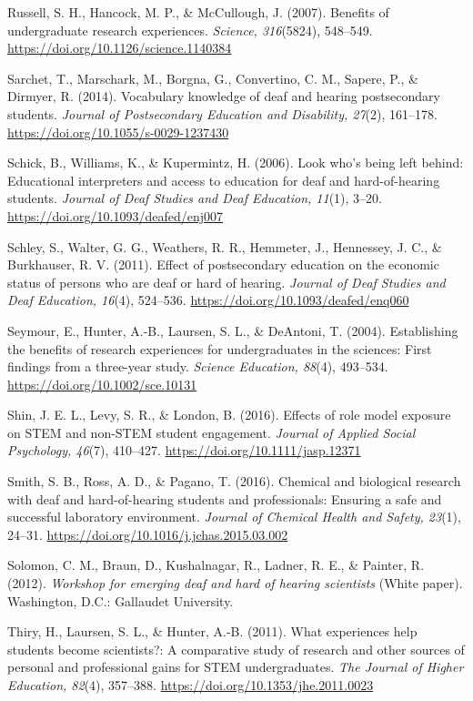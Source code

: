 \documentclass[11.5pt]{sig-alternate} %
\begin{document}
Russell, S. H., Hancock, M. P., \& McCullough, J. (2007). Benefits of undergraduate research experiences. \textit{Science, 316}(5824), 548–549. \url{https://doi.org/10.1126/science.1140384}

Sarchet, T., Marschark, M., Borgna, G., Convertino, C. M., Sapere, P., \& Dirmyer, R. (2014). Vocabulary knowledge of deaf and hearing postsecondary students. \textit{Journal of Postsecondary Education and Disability, 27}(2), 161–178. \url{https://doi.org/10.1055/s-0029-1237430}

Schick, B., Williams, K., \& Kupermintz, H. (2006). Look who’s being left behind: Educational interpreters and access to education for deaf and hard-of-hearing students. \textit{Journal of Deaf Studies and Deaf Education, 11}(1), 3–20. \url{https://doi.org/10.1093/deafed/enj007}

Schley, S., Walter, G. G., Weathers, R. R., Hemmeter, J., Hennessey, J. C., \& Burkhauser, R. V. (2011). Effect of postsecondary education on the economic status of persons who are deaf or hard of hearing. \textit{Journal of Deaf Studies and Deaf Education, 16}(4), 524–536. \url{https://doi.org/10.1093/deafed/enq060}

Seymour, E., Hunter, A.-B., Laursen, S. L., \& DeAntoni, T. (2004). Establishing the benefits of research experiences for undergraduates in the sciences: First findings from a three-year study. \textit{Science Education, 88}(4), 493–534. \url{https://doi.org/10.1002/sce.10131}

Shin, J. E. L., Levy, S. R., \& London, B. (2016). Effects of role model exposure on STEM and non-STEM student engagement. \textit{Journal of Applied Social Psychology, 46}(7), 410–427. \url{https://doi.org/10.1111/jasp.12371}

Smith, S. B., Ross, A. D., \& Pagano, T. (2016). Chemical and biological research with deaf and hard-of-hearing students and professionals: Ensuring a safe and successful laboratory environment. \textit{Journal of Chemical Health and Safety, 23}(1), 24–31. \url{https://doi.org/10.1016/j.jchas.2015.03.002}

Solomon, C. M., Braun, D., Kushalnagar, R., Ladner, R. E., \& Painter, R. (2012). \textit{Workshop for emerging deaf and hard of hearing scientists} (White paper). Washington, D.C.: Gallaudet University.

Thiry, H., Laursen, S. L., \& Hunter, A.-B. (2011). What experiences help students become scientists?: A comparative study of research and other sources of personal and professional gains for STEM undergraduates. \textit{The Journal of Higher Education, 82}(4), 357–388. \url{https://doi.org/10.1353/jhe.2011.0023}
\end{document}
